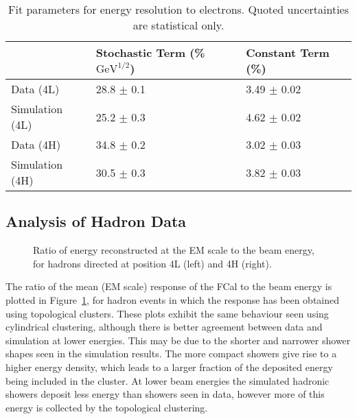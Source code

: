 \begin{table}[!htb]
\begin{center}
\begin{tabular}{|l|l|l|}
\hline
& Stochastic Term (\% $\mathrm{GeV}^{1/2}$) & Constant Term (\%) \\
\hline
Data (4L) & 28.8 $\pm$ 0.1 & 3.49 $\pm$ 0.02\\
Simulation (4L) & 25.2 $\pm$ 0.3 & 4.62 $\pm$ 0.02\\
Data (4H) & 34.8 $\pm$ 0.2 & 3.02 $\pm$ 0.03\\
Simulation (4H) & 30.5 $\pm$ 0.3 & 3.82 $\pm$ 0.03\\
\hline
\end{tabular}
\end{center}
\caption{Fit parameters for energy resolution to electrons. Quoted uncertainties are statistical only.}
\label{table_resolution_electrons_420}
\end{table}

%

%
%
%
\subsection{Analysis of Hadron Data}
\begin{figure}[!htb]
\begin{centering}
\caption{Ratio of energy reconstructed at the EM scale to the beam energy, for hadrons directed at position 4L (left) and 4H (right).} 
\label{hadron_linearity_EMt420}
\end{centering}
\end{figure}

The ratio of the mean (EM scale) response of the FCal to the beam energy is plotted in Figure~\ref{hadron_linearity_EMt420}, for hadron events in which the response has been obtained using topological clusters. These plots exhibit the same behaviour seen using cylindrical clustering, although there is better agreement between data and simulation at lower energies. This may be due to the shorter and narrower shower shapes seen in the simulation results. The more compact showers give rise to a higher energy density, which leads to a larger fraction of the deposited energy being included in the cluster. At lower beam energies the simulated hadronic showers deposit less energy than showers seen in data, however more of this energy is collected by the topological clustering.


